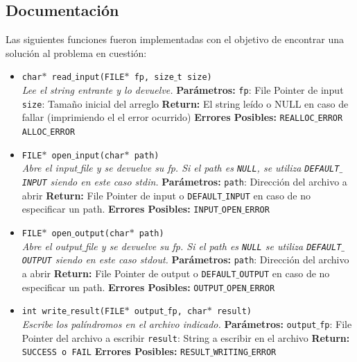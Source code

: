 \documentclass[a4paper, 10pt]{article}
\def\code#1{\texttt{#1}}
\begin{document}
		\subsection{Documentación}
			Las siguientes funciones fueron implementadas con el objetivo de encontrar una solución al problema
			en cuestión:
			\begin{itemize}

				\item \code{char$*$ read$\_$input(FILE$*$ fp, size$\_$t size)}
				\\\textit{Lee el string entrante y lo devuelve.}
					\subitem \textbf{Parámetros:}
						\subsubitem \code{fp}: File Pointer de input
						\subsubitem \code{size}: Tamaño inicial del arreglo
					\subitem \textbf{Return:}
						\subsubitem El string leído o NULL en caso de fallar
						(imprimiendo el el error ocurrido)
					\subitem \textbf{Errores Posibles:}
						\subsubitem \code{REALLOC$\_$ERROR}
						\subsubitem \code{ALLOC$\_$ERROR}

				\item \code{FILE$*$ open$\_$input(char$*$ path)}
				\\\textit{Abre el input$\_$file y se devuelve su fp.
				Si el path es \code{NULL},
				se utiliza \code{DEFAULT$\_$INPUT} siendo en este caso stdin.}
					\subitem \textbf{Parámetros:}
						\subsubitem \code{path}: Dirección del archivo a abrir
					\subitem \textbf{Return:}
						\subsubitem File Pointer de input o \code{DEFAULT$\_$INPUT}
						en caso de no especificar un path.
					\subitem \textbf{Errores Posibles:}
						\subsubitem \code{INPUT$\_$OPEN$\_$ERROR}

				\item \code{FILE$*$ open$\_$output(char$*$ path)}
				\\\textit{Abre el output$\_$file y se devuelve su fp. Si el path es \code{NULL}
				se utiliza \code{DEFAULT$\_$OUTPUT} siendo en este caso stdout.}
					\subitem \textbf{Parámetros:}
						\subsubitem \code{path}: Dirección del archivo a abrir
					\subitem \textbf{Return:}
						\subsubitem File Pointer de output o \code{DEFAULT$\_$OUTPUT} en caso de
						no especificar un path.
					\subitem \textbf{Errores Posibles:}
						\subsubitem \code{OUTPUT$\_$OPEN$\_$ERROR}

				\item \code{int write$\_$result(FILE$*$ output$\_$fp, char$*$ result)}
				\\\textit{Escribe los palíndromos en el archivo indicado.}
					\subitem \textbf{Parámetros:}
						\subsubitem \code{output$\_$fp}: File Pointer del archivo a escribir
						\subsubitem \code{result}: String a escribir en el archivo
					\subitem \textbf{Return:}
						\subsubitem \code{SUCCESS o FAIL}
					\subitem \textbf{Errores Posibles:}
						\subsubitem \code{RESULT$\_$WRITING$\_$ERROR}


\end{itemize}
\end{document}
